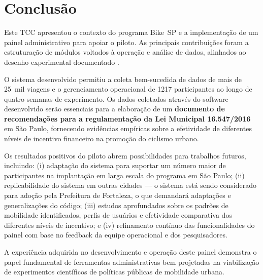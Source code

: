 
\chapter{Conclusão}
\label{cap:conclusao}

Este TCC apresentou o contexto do programa Bike~SP e a implementação de um
painel administrativo para apoiar o piloto. As principais contribuições foram a
estruturação de módulos voltados à operação e análise de dados, alinhados ao
desenho experimental documentado \citep{faria2023:bikespCaseStudy}.

O sistema desenvolvido permitiu a coleta bem-sucedida de dados de mais de 25~mil
viagens e o gerenciamento operacional de 1217 participantes ao longo de quatro
semanas de experimento. Os dados coletados através do software desenvolvido
serão essenciais para a elaboração de um \textbf{documento de recomendações para
a regulamentação da Lei Municipal 16.547/2016} em São Paulo, fornecendo
evidências empíricas sobre a efetividade de diferentes níveis de incentivo
financeiro na promoção do ciclismo urbano.

Os resultados positivos do piloto abrem possibilidades para trabalhos futuros,
incluindo: (i) adaptação do sistema para suportar um número maior de
participantes na implantação em larga escala do programa em São Paulo; (ii)
replicabilidade do sistema em outras cidades --- o sistema está sendo
considerado para adoção pela Prefeitura de Fortaleza, o que demandará adaptações
e generalizações do código; (iii) estudos aprofundados sobre os padrões de
mobilidade identificados, perfis de usuários e efetividade comparativa dos
diferentes níveis de incentivo; e (iv) refinamento contínuo das funcionalidades
do painel com base no feedback da equipe operacional e dos pesquisadores.

A experiência adquirida no desenvolvimento e operação deste painel demonstra o
papel fundamental de ferramentas administrativas bem projetadas na viabilização
de experimentos científicos de políticas públicas de mobilidade urbana.


